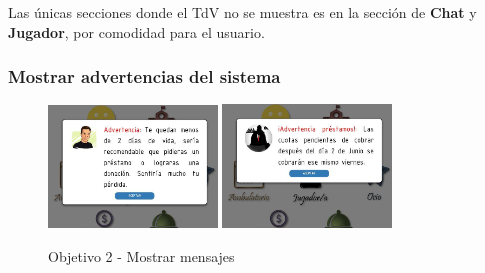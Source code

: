 Las únicas secciones donde el TdV no se muestra es en la sección de \textbf{Chat} y \textbf{Jugador}, por comodidad para el usuario.

\subsubsection{Mostrar advertencias del sistema}
\begin{figure}[ht]
  \centering
    \includegraphics[width=0.4\textwidth]{imagenes/Objetivo2.png}
    \includegraphics[width=0.4\textwidth]{imagenes/Objetivo2b.png}
    \caption{Objetivo 2 - Mostrar mensajes}
    \label{objetivoIm2}
\end{figure}

